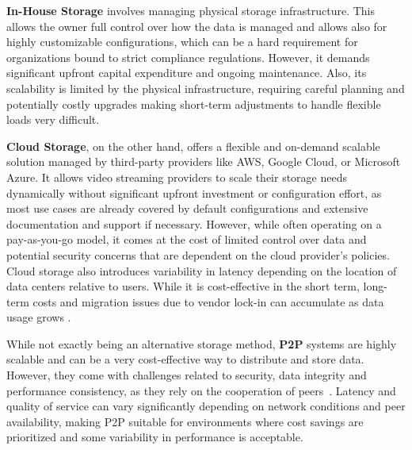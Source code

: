 \textbf{In-House Storage} involves managing physical storage infrastructure. This allows the owner full control over how the data is managed and allows also for highly customizable configurations, which can be a hard requirement for organizations bound to strict compliance regulations. However, it demands significant upfront capital expenditure and ongoing maintenance. Also, its scalability is limited by the physical infrastructure, requiring careful planning and potentially costly upgrades making short-term adjustments to handle flexible loads very difficult. 

\textbf{Cloud Storage}, on the other hand, offers a flexible and on-demand scalable solution managed by third-party providers like AWS, Google Cloud, or Microsoft Azure. It allows video streaming providers to scale their storage needs dynamically without significant upfront investment or configuration effort, as most use cases are already covered by default configurations and extensive documentation and support if necessary. However, while often operating on a pay-as-you-go model, it comes at the cost of limited control over data and potential security concerns that are dependent on the cloud provider's policies. Cloud storage also introduces variability in latency depending on the location of data centers relative to users. While it is cost-effective in the short term, long-term costs and migration issues due to vendor lock-in can accumulate as data usage grows \parencite{cloud_streaming_cost}.

While not exactly being an alternative storage method, \textbf{\ac{P2P}} systems are highly scalable and can be a very cost-effective way to distribute and store data. However, they come with challenges related to security, data integrity and performance consistency, as they rely on the cooperation of peers~\parencite{p2p}. Latency and quality of service can vary significantly depending on network conditions and peer availability, making \ac{P2P} suitable for environments where cost savings are prioritized and some variability in performance is acceptable.

